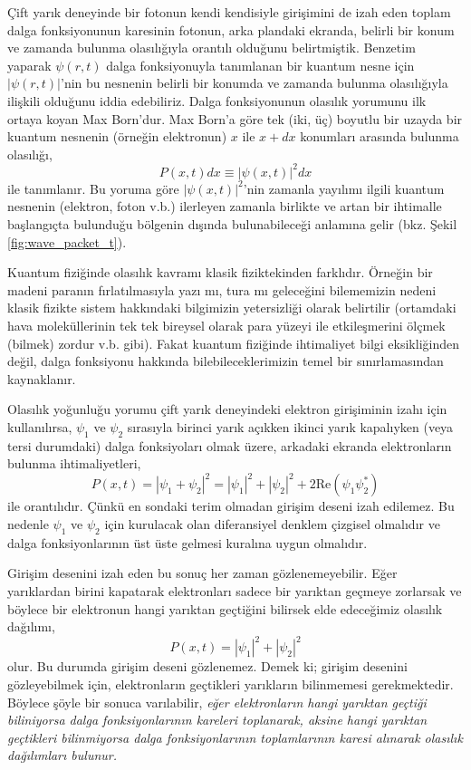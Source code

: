 \documentclass[a4paper,12pt, twoside]{article}
\begin{document}
Çift yarık deneyinde bir fotonun kendi kendisiyle girişimini de izah eden toplam dalga fonksiyonunun karesinin fotonun, arka plandaki ekranda, belirli bir konum ve zamanda bulunma olasılığıyla orantılı olduğunu belirtmiştik. Benzetim yaparak $\psi(r,t)$ dalga fonksiyonuyla tanımlanan bir kuantum nesne için $|\psi(r,t)|$'nin bu nesnenin belirli bir konumda ve zamanda bulunma olasılığıyla ilişkili olduğunu iddia edebiliriz. Dalga fonksiyonunun olasılık yorumunu ilk ortaya koyan Max Born'dur. Max Born'a göre tek (iki, üç) boyutlu bir uzayda bir kuantum nesnenin (örneğin elektronun) $x$ ile $x+dx$ konumları arasında bulunma olasılığı,
\begin{equation}
P(x,t) dx \equiv |\psi(x,t)|^2 dx
\label{eq:probability_interp}
\end{equation}
ile tanımlanır. Bu yoruma göre $|\psi(x,t)|^2$'nin zamanla yayılımı ilgili kuantum nesnenin (elektron, foton v.b.) ilerleyen zamanla birlikte ve artan bir ihtimalle başlangıçta bulunduğu bölgenin dışında bulunabileceği anlamına gelir (bkz. Şekil \ref{fig:wave_packet_t}).

Kuantum fiziğinde olasılık kavramı klasik fiziktekinden farklıdır. Örneğin bir madeni paranın fırlatılmasıyla yazı mı, tura mı geleceğini bilememizin nedeni klasik fizikte sistem hakkındaki bilgimizin yetersizliği olarak belirtilir (ortamdaki hava moleküllerinin tek tek bireysel olarak para yüzeyi ile etkileşmerini ölçmek (bilmek) zordur v.b. gibi). Fakat kuantum fiziğinde ihtimaliyet bilgi eksikliğinden değil, dalga fonksiyonu hakkında bilebileceklerimizin temel bir sınırlamasından kaynaklanır.

Olasılık yoğunluğu yorumu çift yarık deneyindeki elektron girişiminin izahı için kullanılırsa, $\psi_1$ ve $\psi_2$ sırasıyla birinci yarık açıkken ikinci yarık kapalıyken (veya tersi durumdaki) dalga fonksiyoları olmak üzere, arkadaki ekranda elektronların bulunma ihtimaliyetleri,
\begin{equation}
P(x,t) = |\psi_1 + \psi_2|^2 = |\psi_1 |^2 + |\psi_2|^2 + 2\text{Re}(\psi_1  \psi_2^*)
\label{eq:interference_probability}
\end{equation}
ile orantılıdır. Çünkü en sondaki terim olmadan girişim deseni izah edilemez. Bu nedenle $\psi_1$ ve $\psi_2$ için kurulacak olan diferansiyel denklem çizgisel olmalıdır ve dalga fonksiyonlarının üst üste gelmesi kuralına uygun olmalıdır.

Girişim desenini izah eden bu sonuç her zaman gözlenemeyebilir. Eğer yarıklardan birini kapatarak elektronları sadece bir yarıktan geçmeye zorlarsak ve böylece bir elektronun hangi yarıktan geçtiğini bilirsek elde edeceğimiz olasılık dağılımı,
\begin{equation}
P(x,t) = |\psi_1 |^2 + |\psi_2|^2
\label{eq:classical_probability}
\end{equation}
olur. Bu durumda girişim deseni gözlenemez. Demek ki; girişim desenini gözleyebilmek için, elektronların geçtikleri yarıkların bilinmemesi gerekmektedir. Böylece şöyle bir sonuca varılabilir, \emph{eğer elektronların hangi yarıktan geçtiği biliniyorsa dalga fonksiyonlarının kareleri toplanarak, aksine hangi yarıktan geçtikleri bilinmiyorsa dalga fonksiyonlarının toplamlarının karesi alınarak olasılık dağılımları bulunur.}
\end{document}
